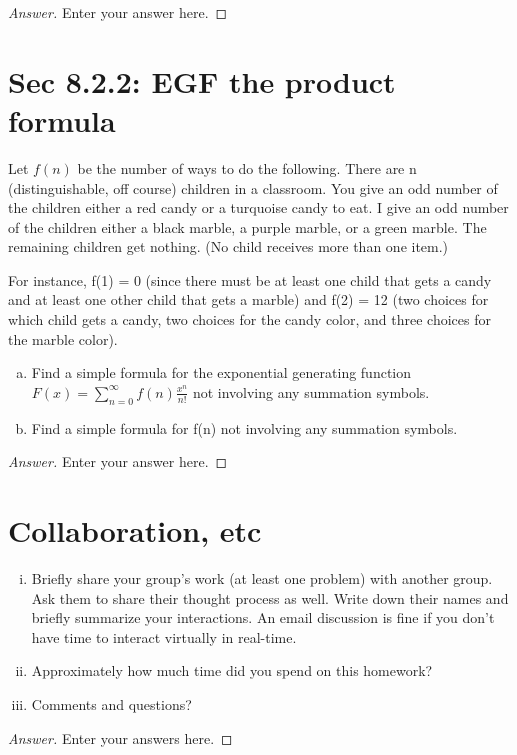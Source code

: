 \documentclass[12pt, oneside]{amsart}
\begin{document}
\begin{proof}[Answer]
	Enter your answer here.
\end{proof}








\section{Sec 8.2.2: EGF the product formula}
Let $f(n)$ be the number of ways to do the following. 
There are n (distinguishable, off course) children in a classroom. 
You give an odd number of the children either a red candy or a turquoise candy to eat. 
I give an odd number of the children either a black marble, a purple marble, or a green marble. 
The remaining children get nothing. (No child receives more than one item.) 

For instance, f(1) = 0 (since there must be at least one child that gets a candy and at least one other child that gets a marble) and f(2) = 12 (two choices for which child gets a candy, two choices for the candy color, and three choices for the marble color). 

\begin{enumerate}[a.]
	\item Find a simple formula for the exponential generating function $F(x)=\sum_{n=0}^\infty f(n) \frac{x^n}{n!}$ not involving any summation symbols.
	\item Find a simple formula for f(n) not involving any summation symbols.
\end{enumerate}

\begin{proof}[Answer]
	Enter your answer here.
\end{proof}



\section{Collaboration, etc}
\begin{enumerate}[i.]
	\item Briefly share your group's work (at least one problem) with another group. Ask them to share their thought process as well. Write down their names and briefly summarize your interactions. An email discussion  is fine if you don't have time to interact virtually in real-time. 
	 
	\item Approximately how much time did you spend on this homework?
	\item 
	Comments and questions?
\end{enumerate}

\begin{proof}[Answer]
	Enter your answers here.
\end{proof}
\end{document}
